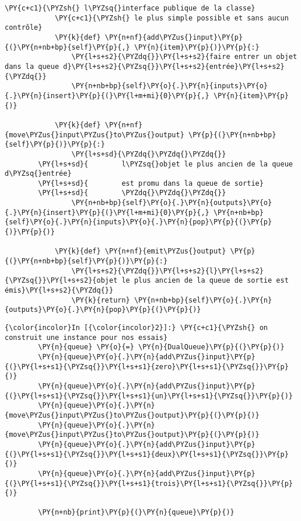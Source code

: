 \begin{Verbatim}[commandchars=\\\{\}]
            \PY{c+c1}{\PYZsh{} l\PYZsq{}interface publique de la classe}
            \PY{c+c1}{\PYZsh{} le plus simple possible et sans aucun contrôle}
            \PY{k}{def} \PY{n+nf}{add\PYZus{}input}\PY{p}{(}\PY{n+nb+bp}{self}\PY{p}{,} \PY{n}{item}\PY{p}{)}\PY{p}{:}
                \PY{l+s+s2}{\PYZdq{}}\PY{l+s+s2}{faire entrer un objet dans la queue d}\PY{l+s+s2}{\PYZsq{}}\PY{l+s+s2}{entrée}\PY{l+s+s2}{\PYZdq{}}
                \PY{n+nb+bp}{self}\PY{o}{.}\PY{n}{inputs}\PY{o}{.}\PY{n}{insert}\PY{p}{(}\PY{l+m+mi}{0}\PY{p}{,} \PY{n}{item}\PY{p}{)}
                
            \PY{k}{def} \PY{n+nf}{move\PYZus{}input\PYZus{}to\PYZus{}output} \PY{p}{(}\PY{n+nb+bp}{self}\PY{p}{)}\PY{p}{:}
                \PY{l+s+sd}{\PYZdq{}\PYZdq{}\PYZdq{}}
        \PY{l+s+sd}{        l\PYZsq{}objet le plus ancien de la queue d\PYZsq{}entrée}
        \PY{l+s+sd}{        est promu dans la queue de sortie}
        \PY{l+s+sd}{        \PYZdq{}\PYZdq{}\PYZdq{}}
                \PY{n+nb+bp}{self}\PY{o}{.}\PY{n}{outputs}\PY{o}{.}\PY{n}{insert}\PY{p}{(}\PY{l+m+mi}{0}\PY{p}{,} \PY{n+nb+bp}{self}\PY{o}{.}\PY{n}{inputs}\PY{o}{.}\PY{n}{pop}\PY{p}{(}\PY{p}{)}\PY{p}{)}
                
            \PY{k}{def} \PY{n+nf}{emit\PYZus{}output} \PY{p}{(}\PY{n+nb+bp}{self}\PY{p}{)}\PY{p}{:}
                \PY{l+s+s2}{\PYZdq{}}\PY{l+s+s2}{l}\PY{l+s+s2}{\PYZsq{}}\PY{l+s+s2}{objet le plus ancien de la queue de sortie est émis}\PY{l+s+s2}{\PYZdq{}}
                \PY{k}{return} \PY{n+nb+bp}{self}\PY{o}{.}\PY{n}{outputs}\PY{o}{.}\PY{n}{pop}\PY{p}{(}\PY{p}{)}
\end{Verbatim}


    \begin{Verbatim}[commandchars=\\\{\}]
{\color{incolor}In [{\color{incolor}2}]:} \PY{c+c1}{\PYZsh{} on construit une instance pour nos essais}
        \PY{n}{queue} \PY{o}{=} \PY{n}{DualQueue}\PY{p}{(}\PY{p}{)}
        \PY{n}{queue}\PY{o}{.}\PY{n}{add\PYZus{}input}\PY{p}{(}\PY{l+s+s1}{\PYZsq{}}\PY{l+s+s1}{zero}\PY{l+s+s1}{\PYZsq{}}\PY{p}{)}
        \PY{n}{queue}\PY{o}{.}\PY{n}{add\PYZus{}input}\PY{p}{(}\PY{l+s+s1}{\PYZsq{}}\PY{l+s+s1}{un}\PY{l+s+s1}{\PYZsq{}}\PY{p}{)}
        \PY{n}{queue}\PY{o}{.}\PY{n}{move\PYZus{}input\PYZus{}to\PYZus{}output}\PY{p}{(}\PY{p}{)}
        \PY{n}{queue}\PY{o}{.}\PY{n}{move\PYZus{}input\PYZus{}to\PYZus{}output}\PY{p}{(}\PY{p}{)}
        \PY{n}{queue}\PY{o}{.}\PY{n}{add\PYZus{}input}\PY{p}{(}\PY{l+s+s1}{\PYZsq{}}\PY{l+s+s1}{deux}\PY{l+s+s1}{\PYZsq{}}\PY{p}{)}
        \PY{n}{queue}\PY{o}{.}\PY{n}{add\PYZus{}input}\PY{p}{(}\PY{l+s+s1}{\PYZsq{}}\PY{l+s+s1}{trois}\PY{l+s+s1}{\PYZsq{}}\PY{p}{)}
        
        \PY{n+nb}{print}\PY{p}{(}\PY{n}{queue}\PY{p}{)}
\end{Verbatim}


